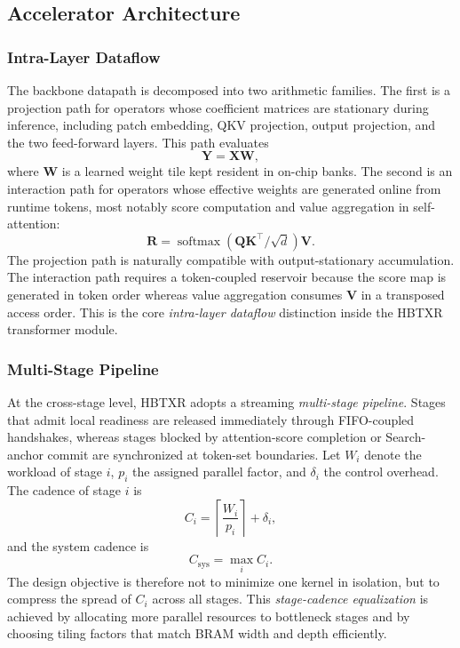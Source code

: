 \documentclass[journal]{IEEEtran}
\begin{document}
\subsection{Accelerator Architecture}
\subsubsection{Intra-Layer Dataflow}
The backbone datapath is decomposed into two arithmetic families. The first is a projection path for operators whose coefficient matrices are stationary during inference, including patch embedding, QKV projection, output projection, and the two feed-forward layers. This path evaluates
\begin{equation}
\mathbf Y = \mathbf X\mathbf W,
\end{equation}
where $\mathbf W$ is a learned weight tile kept resident in on-chip banks. The second is an interaction path for operators whose effective weights are generated online from runtime tokens, most notably score computation and value aggregation in self-attention:
\begin{equation}
\mathbf R = \operatorname{softmax}\!\left(\mathbf Q\mathbf K^{\top}/\sqrt{d}\right)\mathbf V.
\end{equation}
The projection path is naturally compatible with output-stationary accumulation. The interaction path requires a token-coupled reservoir because the score map is generated in token order whereas value aggregation consumes $\mathbf V$ in a transposed access order. This is the core \emph{intra-layer dataflow} distinction inside the HBTXR transformer module.

\subsubsection{Multi-Stage Pipeline}
At the cross-stage level, HBTXR adopts a streaming \emph{multi-stage pipeline}. Stages that admit local readiness are released immediately through FIFO-coupled handshakes, whereas stages blocked by attention-score completion or Search-anchor commit are synchronized at token-set boundaries. Let $W_i$ denote the workload of stage $i$, $p_i$ the assigned parallel factor, and $\delta_i$ the control overhead. The cadence of stage $i$ is
\begin{equation}
C_i=\left\lceil\frac{W_i}{p_i}\right\rceil+\delta_i,
\end{equation}
and the system cadence is
\begin{equation}
C_{\mathrm{sys}}=\max_i C_i.
\end{equation}
The design objective is therefore not to minimize one kernel in isolation, but to compress the spread of $C_i$ across all stages. This \emph{stage-cadence equalization} is achieved by allocating more parallel resources to bottleneck stages and by choosing tiling factors that match BRAM width and depth efficiently.
\end{document}
